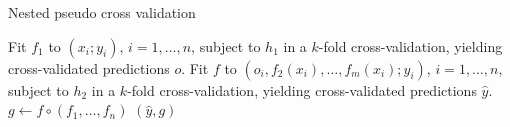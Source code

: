 \begin{algorithm}
\caption{Nested pseudo cross validation} \label{alg:nested-pcv}
    \begin{algorithmic}[1]
            \State Fit $f_1$ to $(x_i; y_i)$, $i = 1, \ldots, n$, subject to $h_1$ in a $k$-fold 
                cross-validation, yielding cross-validated predictions $o$.
            \State Fit $f$ to $(o_i, f_2(x_i), \ldots, f_m(x_i); y_i)$, 
                $i = 1, \ldots, n$, subject to $h_2$ in a $k$-fold cross-validation, yielding 
                cross-validated predictions $\hat{y}$.
            \State $g \gets f \circ (f_1, \ldots, f_n)$
            \State \Return $(\hat{y}, g)$
        \EndFunction
    \end{algorithmic}
\end{algorithm}
